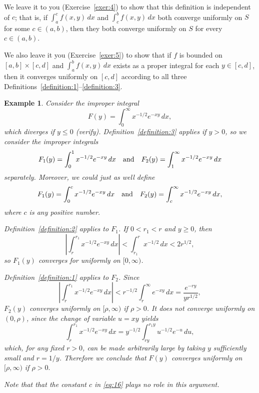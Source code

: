 \documentclass{article}
\newtheorem{example}{Example}
\begin{document}
We leave it to you
(Exercise~\ref{exer:4}) to show that this definition is independent
 of $c$; that is,  if
  $\int_{a}^{c}f(x,y)\,dx$  and
$\int_{c}^{b}f(x,y)\,dx$ both converge uniformly  on $S$ for
some
$c\in(a,b)$, then they both converge uniformly on $S$ for every
$c \in (a,b)$.

We also leave it  you (Exercise~\ref{exer:5}) to show that if
$f$  is bounded
on $[a,b]\times [c,d]$ and  $\int_{a}^{b}f(x,y)\,dx$
exists as a proper integral for each $y\in [c,d]$, then it converges
uniformly  on $[c,d]$ according to all three
Definitions~\ref{definition:1}--\ref{definition:3}.


\begin{example}  \label{example:5}  \rm
Consider the improper integral
$$
F(y)=\int_{0}^{\infty}x^{-1/2}e^{-xy}\,dx,
$$
which diverges
if $y\le 0$ (verify).   Definition~\ref{definition:3}
applies if $y>0$, so we consider the improper
integrals
$$
F_{1}(y)=\int_{0}^{1}x^{-1/2}e^{-xy}\,dx
\text{\quad and\quad}
F_{2}(y)=\int_{1}^{\infty}x^{-1/2}e^{-xy}\,dx
$$
separately. Moreover, we could just as well   define
\begin{equation}\label{eq:16}
F_{1}(y)=\int_{0}^{c}x^{-1/2}e^{-xy}\,dx
\text{\quad and\quad}
F_{2}(y)=\int_{c}^{\infty}x^{-1/2}e^{-xy}\,dx,
\end{equation}
where $c$  is any positive number.


 Definition~\ref{definition:2} applies to $F_{1}$.
If $0<r_{1}<r$  and $y\ge 0$, then
$$
\left|\int_{r}^{r_{1}}x^{-1/2}e^{-xy}\,dx\right| <
\int_{r_{1}}^{r}x^{-1/2}\,dx<2r^{1/2},
$$
so $F_{1}(y)$  converges for uniformly on $[0,\infty)$.

Definition~\ref{definition:1} applies to $F_{2}$. Since
$$
\left|\int_{r}^{r_{1}}x^{-1/2}e^{-xy}\,dx\right| < r^{-1/2}
\int_{r}^{\infty}e^{-xy}\,dx = \frac{e^{-ry}}{yr^{1/2}},
$$
$F_{2}(y)$ converges uniformly on   $[\rho,\infty)$ if
 $\rho>0$. It does not converge uniformly on
$(0,\rho)$, since the change of variable $u=xy$ yields
$$
\int_{r}^{r_{1}}x^{-1/2}e^{-xy}\,dx=y^{-1/2}
\int_{ry}^{r_{1}y}u^{-1/2}e^{-u}\,du,
$$
which, for any fixed $r>0$, can be made arbitrarily large
by taking $y$ sufficiently small and $r=1/y$. Therefore we
conclude that $F(y)$ converges uniformly on $[\rho,\infty)$
if $\rho>0.$

Note that  that the constant $c$ in \eqref{eq:16} plays no role in this
argument.
\end{example}
\end{document}
